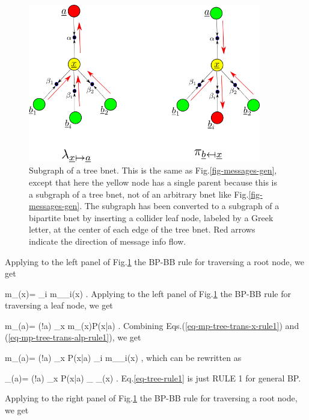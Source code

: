 \begin{figure}[h!]
\centering
\includegraphics[width=4in]
{mpass/mpass-messages-bip-tree.png}
\caption{Subgraph of a tree bnet. 
This 
is the same as 
Fig.\ref{fig-messages-gen},
except that here the yellow
node has a single
parent because 
this is a subgraph of a tree
bnet, not
of an arbitrary
bnet like Fig.\ref{fig-messages-gen}.
The subgraph has been
converted to a subgraph
of a bipartite bnet
by inserting a collider leaf node, labeled
by a Greek letter, 
at the center
of each edge of the tree bnet.
Red arrows indicate
the direction
of message info flow.}
\label{fig-messages-bip-tree}
\end{figure}

Applying to the left panel of
Fig.\ref{fig-messages-bip-tree}
 the BP-BB rule
for traversing a root node, we get

\beq
m_{\alp\ldart \rvx}(x)=
\prod_{i}
m_{\beta_i\rdart \rvx}(x)
\;.
\label{eq-mp-tree-trans-x-rule1}
\eeq
Applying to the left panel of
Fig.\ref{fig-messages-bip-tree}
 the BP-BB rule
for traversing a leaf node, we get

\beq
m_{\alp\rdart\rva}(a)=
\caln(!a)
\sum_x
m_{\alp\ldart \rvx}(x)P(x|a)
\;.
\label{eq-mp-tree-trans-alp-rule1}
\eeq
Combining Eqs.(\ref{eq-mp-tree-trans-x-rule1})
and (\ref{eq-mp-tree-trans-alp-rule1}), we get

\beq
m_{\alp\rdart\rva}(a)=
\caln(!a)
\sum_x P(x|a)
\prod_{i}
m_{\beta_i\rdart \rvx}(x)
\;,
\eeq
which can be
rewritten as 

\beq
\lam_{\rvx\rdart\rva}(a)=
\caln(!a)
\sum_x P(x|a)
_
{\lam_\rvx(x)}
\;.
\label{eq-tree-rule1}
\eeq
Eq.\ref{eq-tree-rule1} is just RULE 1
for general BP.

Applying to the right panel of
Fig.\ref{fig-messages-bip-tree}
 the BP-BB rule
for traversing a root node, we get

